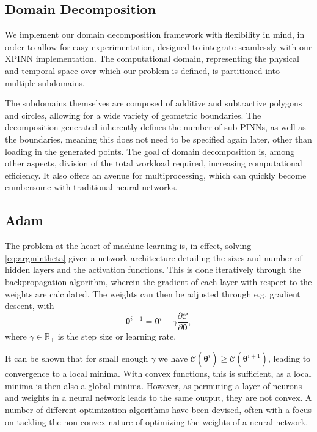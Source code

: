 \subsection{Domain Decomposition}
We implement our domain decomposition framework with flexibility in mind, in order to allow for easy experimentation, designed to integrate seamlessly with our XPINN implementation.
The computational domain, representing the physical and temporal space over which our problem is defined, is partitioned into multiple subdomains.

The subdomains themselves are composed of additive and subtractive polygons and circles, allowing for a wide variety of geometric boundaries.
The decomposition generated inherently defines the number of sub-PINNs, as well as the boundaries, meaning this does not need to be specified again later, other than loading in the generated points.
The goal of domain decomposition is, among other aspects, division of the total workload required, increasing computational efficiency.
It also offers an avenue for multiprocessing, which can quickly become cumbersome with traditional neural networks.

\subsection{Adam}
The problem at the heart of machine learning is, in effect, solving \eqref{eq:argmintheta} given a network architecture detailing the sizes and number of hidden layers and the activation functions.
This is done iteratively through the backpropagation algorithm, wherein the gradient of each layer with respect to the weights are calculated.
The weights can then be adjusted through e.g. gradient descent, with
\begin{equation}\label{eq:backprop}
    \boldsymbol{\theta}^{i+1} = \boldsymbol{\theta}^i - \gamma \frac{\partial \mathcal{C}}{\partial \boldsymbol{\theta}},
\end{equation}
where $\gamma \in \mathbb{R}_{+}$ is the step size or learning rate.

It can be shown that for small enough $\gamma$ we have $\mathcal{C}(\boldsymbol{\theta}^i) \geq \mathcal{C}(\boldsymbol{\theta}^{i+1})$, leading to convergence to a local minima.
With convex functions, this is sufficient, as a local minima is then also a global minima.
However, as permuting a layer of neurons and weights in a neural network leads to the same output, they are not convex.
A number of different optimization algorithms have been devised, often with a focus on tackling the non-convex nature of optimizing the weights of a neural network.

